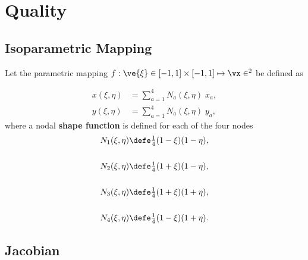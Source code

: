 \documentclass[14pt,letterpaper,fleqn]{extreport}
\begin{document}
\clearpage

\chapter{Quality}

\section{Isoparametric Mapping}
Let the parametric mapping $f: \ve{\xi} \in [-1, 1] \times [-1, 1] \mapsto \vx \in \real^2$ be defined as

\begin{align}
  x(\xi,\eta) & = \sum_{a=1}^4 N_a(\xi, \eta) \; x_a, \label{eq:shapex} \\
  y(\xi,\eta) & = \sum_{a=1}^4 N_a(\xi, \eta) \; y_a, \label{eq:shapey}
\end{align}
where a nodal {\bf shape function} is defined for each of the four nodes
\begin{align}
  N_1(\xi, \eta) & \defe \tfrac{1}{4} (1 - \xi) (1 - \eta), \\
  & \nonumber \\
  N_2(\xi, \eta) & \defe \tfrac{1}{4} (1 + \xi) (1 - \eta), \\
  & \nonumber \\
  N_3(\xi, \eta) & \defe \tfrac{1}{4} (1 + \xi) (1 + \eta), \\
  & \nonumber \\
  N_4(\xi, \eta) & \defe \tfrac{1}{4} (1 - \xi) (1 + \eta).
\end{align}

\clearpage

\section{Jacobian}
\end{document}
